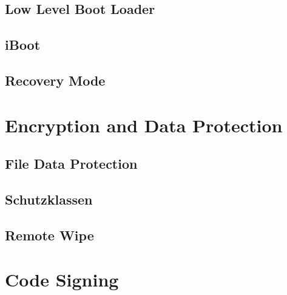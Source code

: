     \subsection{Low Level Boot Loader}
    \label{sec:LowLevelBootLoader1}
    \subsection{iBoot}
    \label{sec:iBoot1}
    \subsection{Recovery Mode}
    \label{sec:RecoveryMode}

\section{Encryption and Data Protection}
\label{sec:EncryptionandDataProtection}

\subsection{File Data Protection}
\label{sec:FileDataProtection}



\subsection{Schutzklassen}
\label{sec:Schutzklassen}

\subsection{Remote Wipe}
\label{sec:RemoteWipe}

\section{Code Signing}
\label{sec:CodeSigning}

